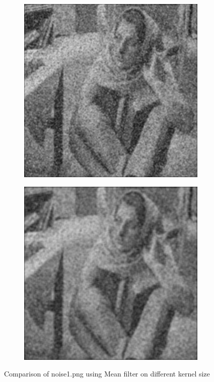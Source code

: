 \documentclass[12pt,a4paper]{report}
\begin{document}
\begin{figure}[!htb]
\begin{minipage}{\linewidth}
    \begin{subfigure}{0.49\textwidth}
      \includegraphics[width=\linewidth]{output/noise1_q1_K5P2.png}
    \end{subfigure}
    \begin{subfigure}{0.49\textwidth}
      \includegraphics[width=\linewidth]{output/noise1_q1_K7P3.png}
    \end{subfigure}

  \caption{Comparison of noise1.png using Mean filter on different kernel size}
  \end{minipage}

\end{figure}
\end{document}
